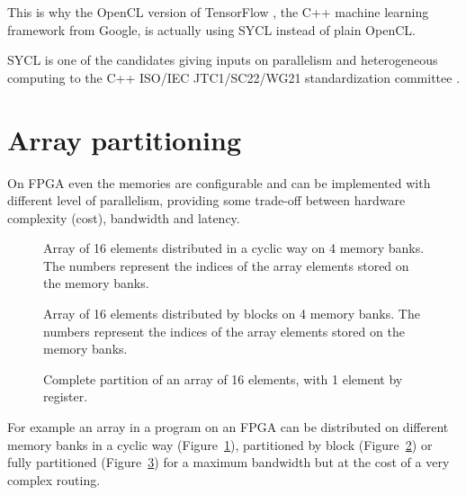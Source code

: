 \documentclass[sigplan, review, authordraft]{acmart}
\begin{document}
This is why the OpenCL version of TensorFlow \cite{TensorFlow-1.0},
the C++ machine learning framework from Google, is actually using SYCL
instead of plain OpenCL.

SYCL is one of the candidates giving inputs on parallelism and
heterogeneous computing to the C++ ISO/IEC JTC1/SC22/WG21
standardization committee
\cite{C++:P00236R0:SYCL,C++:P0362R0,C++:P0363R0,C++:P0367R0}.
\iffalse
  WG21,
presented at C++ F2F committee Jacksonville 2016/02
 Oulu 2016/06
 Khronos committed to provide Open Source implementations of OpenCL and SYCL
\fi


\section{Array partitioning}
\label{sec:array-partitioning}

On FPGA even the memories are configurable and can be implemented with
different level of parallelism, providing some trade-off between hardware
complexity (cost), bandwidth and latency.

\begin{figure}
  \caption{Array of 16 elements distributed in a cyclic way on 4 memory
    banks. The numbers represent the indices of the array elements stored
    on the memory banks.}
\label{fig:cyclic-array}
\end{figure}

\begin{figure}
  \caption{Array of 16 elements distributed by blocks on 4 memory
    banks. The numbers represent the indices of the array elements stored
    on the memory banks.}
\label{fig:block-array}
\end{figure}

\begin{figure}
  \caption{Complete partition of an array of 16 elements, with 1 element
    by register.}
\label{fig:complete-partition-array}
\end{figure}

For example an array in a program on an FPGA can be distributed on
different memory banks in a cyclic way (Figure~\ref{fig:cyclic-array}),
partitioned by block (Figure~\ref{fig:block-array}) or fully partitioned
(Figure~\ref{fig:complete-partition-array}) for a maximum bandwidth but at
the cost of a very complex routing.
\end{document}

